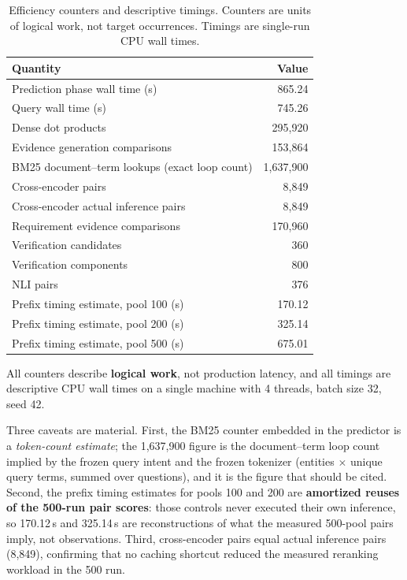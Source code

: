 \documentclass[11pt,a4paper]{article}
\begin{document}
\begin{table}[htbp]
\centering
\small
\caption{Efficiency counters and descriptive timings. Counters are units of logical work, not target
occurrences. Timings are single-run CPU wall times.}
\label{tab:eff}
\begin{tabular}{lr}
\toprule
Quantity & Value \\
\midrule
Prediction phase wall time (s) & 865.24 \\
Query wall time (s) & 745.26 \\
Dense dot products & 295{,}920 \\
Evidence generation comparisons & 153{,}864 \\
BM25 document--term lookups (exact loop count) & 1{,}637{,}900 \\
Cross-encoder pairs & 8{,}849 \\
Cross-encoder actual inference pairs & 8{,}849 \\
Requirement evidence comparisons & 170{,}960 \\
Verification candidates & 360 \\
Verification components & 800 \\
NLI pairs & 376 \\
\midrule
Prefix timing estimate, pool 100 (s) & 170.12 \\
Prefix timing estimate, pool 200 (s) & 325.14 \\
Prefix timing estimate, pool 500 (s) & 675.01 \\
\bottomrule
\end{tabular}
\end{table}

All counters describe \textbf{logical work}, not production latency, and all timings are descriptive CPU wall
times on a single machine with 4 threads, batch size 32, seed 42.

Three caveats are material. First, the BM25 counter embedded in the predictor is a \emph{token-count
estimate}; the 1{,}637{,}900 figure is the document--term loop count implied by the frozen query intent and
the frozen tokenizer (entities $\times$ unique query terms, summed over questions), and it is the figure that
should be cited. Second, the prefix timing estimates for pools 100 and 200 are \textbf{amortized reuses of
the 500-run pair scores}: those controls never executed their own inference, so 170.12\,s and 325.14\,s are
reconstructions of what the measured 500-pool pairs imply, not observations. Third, cross-encoder pairs equal
actual inference pairs (8{,}849), confirming that no caching shortcut reduced the measured reranking workload
in the 500 run.
\end{document}
